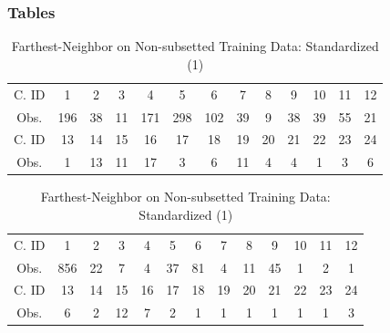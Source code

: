 \documentclass{beamer}
\begin{document}
\begin{frame}

	\frametitle{Tables}
\begin{table}[H]
\center
\begin{tabular}{c c c c c c c c c c c c c}
\hline
C. ID           & 1 & 2 & 3 & 4 & 5 & 6 & 7 & 8 & 9 & 10 & 11 & 12  \\
Obs. 		 &196 & 38 & 11 & 171 & 298 & 102 & 39 & 9 & 38 & 39 & 55 & 21  \\
\hline
C. ID           & 13 & 14 & 15 & 16 & 17 & 18 & 19 & 20 & 21 & 22 & 23 & 24  \\
Obs.         	& 1 & 13 & 11 & 17 & 3 & 6 & 11 & 4 & 4 & 1 & 3 & 6  \\
\hline
\end{tabular}
\caption{Farthest-Neighbor on Non-subsetted Training Data: Normalized (3)}
\begin{tabular}{c c c c c c c c c c c c c}
\hline
C. ID           & 1 & 2 & 3 & 4 & 5 & 6 & 7 & 8 & 9 & 10 & 11 & 12  \\
Obs. 		 & 856 & 22 & 7 & 4 & 37 & 81 & 4 & 11 & 45 & 1 & 2 & 1  \\
\hline
C. ID           & 13 & 14 & 15 & 16 & 17 & 18 & 19 & 20 & 21 & 22 & 23 & 24  \\
Obs.         	 & 6 & 2 & 12 & 7 & 2 & 1 & 1 & 1 & 1 & 1 & 1 & 3  \\
\hline
\end{tabular}
\caption{Farthest-Neighbor on Non-subsetted Training Data: Standardized (1)}
\end{table}
\end{frame}
\end{document}
